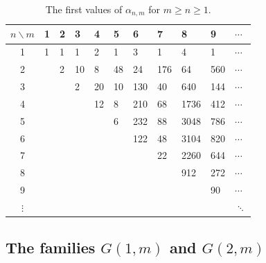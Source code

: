 \documentclass[letterpaper,12pt]{article}
\begin{document}
\begin{table}[H]
\centering
\begin{tabular*}{\linewidth}{@{\extracolsep{\fill}}c|llllllllll@{}}
\toprule
$n\backslash m$ &  1 & 2 & 3  & 4  & 5  & 6   & 7   & 8    & 9   & $\cdots$                           \\ \midrule
 

1                                                           & 1 & 1 & 1  & 2  & 1  & 3   & 1   & 4    & 1   & $\cdots$                           \\
2                                                           &   & 2 & 10 & 8  & 48 & 24  & 176 & 64   & 560 & $\cdots$\\
3                                                           &   &   & 2  & 20 & 10 & 130 & 40  & 640  & 144 & $\cdots$                           \\
4                                                           &   &   &    & 12 & 8  & 210 & 68  & 1736 & 412 & $\cdots$                           \\
5                                                           &   &   &    &    & 6  & 232 & 88  & 3048 & 786 & $\cdots$                           \\
6                                                           &   &   &    &    &    & 122 & 48  & 3104 & 820 & $\cdots$                           \\
7                                                           &   &   &    &    &    &     & 22  & 2260 & 644 & $\cdots$                           \\
8                                                           &   &   &    &    &    &     &     & 912  & 272 & $\cdots$                           \\
9                                                           &   &   &    &    &    &     &     &      & 90  & $\cdots$                           \\
$\vdots$                                                    &   &   &    &    &    &     &     &      &     & $\ddots$                          
\end{tabular*}
\caption{The first values of $\alpha_{n,m}$ for $m\geq n \geq 1$.}
\label{tab:number_optimal_solutons}
\end{table}




 


\subsection{The families \texorpdfstring{$G(1,m)$}{} and \texorpdfstring{$G(2,m)$}{}}
\end{document}
